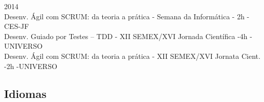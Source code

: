 \documentclass[12pt, a4paper, sans]{moderncv}
\begin{document}
\cventry{}
{}{2014}{
\\Desenv. Ágil com SCRUM: da teoria a prática - Semana da Informática - 2h - CES-JF
\\Desenv. Guiado por Testes – TDD  - XII SEMEX/XVI Jornada Científica -4h - UNIVERSO
\\Desenv. Ágil com SCRUM: da teoria a prática - XII SEMEX/XVI Jornata Cient. -2h -UNIVERSO
}{}{}

%
%

\subsection{Idiomas}

%
%

\end{document}
